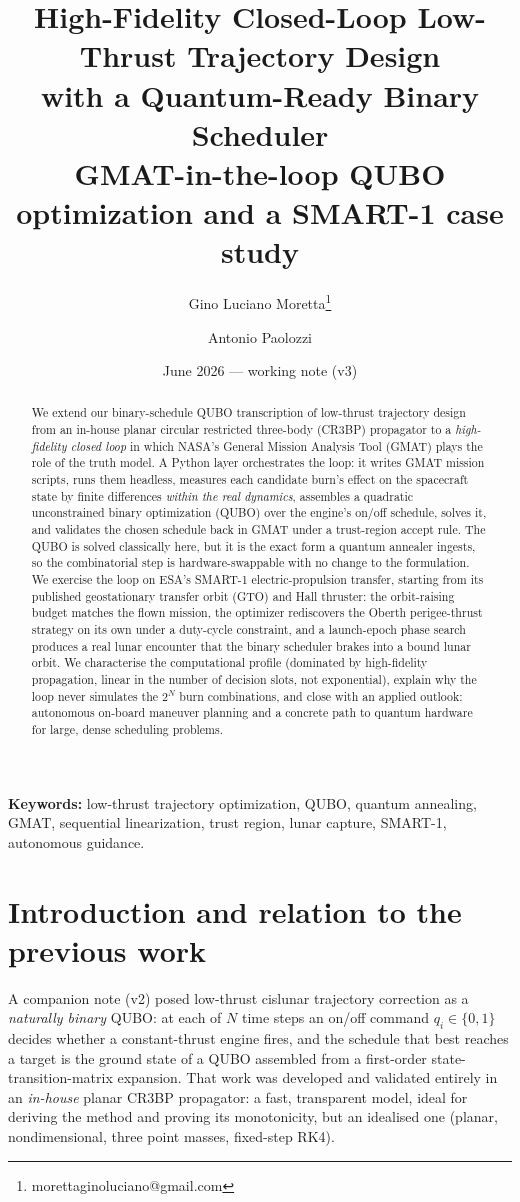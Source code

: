 \documentclass[11pt,a4paper]{article}
\title{\textbf{High-Fidelity Closed-Loop Low-Thrust Trajectory Design\\
with a Quantum-Ready Binary Scheduler}\\[2pt]
\large GMAT-in-the-loop QUBO optimization and a SMART-1 case study}
\author[1]{Gino Luciano Moretta\thanks{morettaginoluciano@gmail.com}}
\author[1]{Antonio Paolozzi}
\affil[1]{School of Aerospace Engineering, Sapienza Universit\`a di Roma}
\date{June 2026 --- working note (v3)}
\theoremstyle{plain}
\begin{document}
\maketitle

\begin{abstract}
We extend our binary-schedule QUBO transcription of low-thrust trajectory
design from an in-house planar circular restricted three-body (CR3BP)
propagator to a \emph{high-fidelity closed loop} in which NASA's General
Mission Analysis Tool (GMAT) plays the role of the truth model. A Python
layer orchestrates the loop: it writes GMAT mission scripts, runs them
headless, measures each candidate burn's effect on the spacecraft state by
finite differences \emph{within the real dynamics}, assembles a quadratic
unconstrained binary optimization (QUBO) over the engine's on/off schedule,
solves it, and validates the chosen schedule back in GMAT under a
trust-region accept rule. The QUBO is solved classically here, but it is the
exact form a quantum annealer ingests, so the combinatorial step is
hardware-swappable with no change to the formulation. We exercise the loop on
ESA's SMART-1 electric-propulsion transfer, starting from its published
geostationary transfer orbit (GTO) and Hall thruster: the orbit-raising
budget matches the flown mission, the optimizer rediscovers the Oberth
perigee-thrust strategy on its own under a duty-cycle constraint, and a
launch-epoch phase search produces a real lunar encounter that the binary
scheduler brakes into a bound lunar orbit. We characterise the computational
profile (dominated by high-fidelity propagation, linear in the number of
decision slots, not exponential), explain why the loop never simulates the
$2^{N}$ burn combinations, and close with an applied outlook: autonomous
on-board maneuver planning and a concrete path to quantum hardware for large,
dense scheduling problems.
\end{abstract}

\noindent\textbf{Keywords:} low-thrust trajectory optimization, QUBO, quantum
annealing, GMAT, sequential linearization, trust region, lunar capture,
SMART-1, autonomous guidance.

\section{Introduction and relation to the previous work}
A companion note (v2) posed low-thrust cislunar trajectory correction as a
\emph{naturally binary} QUBO: at each of $N$ time steps an on/off command
$q_i\in\{0,1\}$ decides whether a constant-thrust engine fires, and the
schedule that best reaches a target is the ground state of a QUBO assembled
from a first-order state-transition-matrix expansion. That work was developed
and validated entirely in an \emph{in-house} planar CR3BP propagator: a fast,
transparent model, ideal for deriving the method and proving its
monotonicity, but an idealised one (planar, nondimensional, three point
masses, fixed-step RK4).
\end{document}
